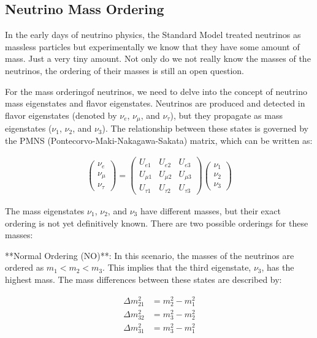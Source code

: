 \subsection{Neutrino Mass Ordering}

In the early days of neutrino physics, the Standard Model treated neutrinos as massless particles but experimentally we know that they have some amount of mass.
Just a very tiny amount.
Not only do we not really know the masses of the neutrinos, the ordering of their masses is still an open question.

For the mass orderingof neutrinos, we need to delve into the concept of neutrino mass eigenstates and flavor eigenstates.
Neutrinos are produced and detected in flavor eigenstates (denoted by $\nu_e$, $\nu_\mu$, and $\nu_\tau$), but they propagate as mass eigenstates ($\nu_1$, $\nu_2$, and $\nu_3$).
The relationship between these states is governed by the PMNS (Pontecorvo-Maki-Nakagawa-Sakata) matrix, which can be written as:

\begin{align}
  \begin{pmatrix}
    \nu_e \\
    \nu_\mu \\
    \nu_\tau
  \end{pmatrix}
  =
  \begin{pmatrix}
    U_{e1} & U_{e2} & U_{e3} \\
    U_{\mu1} & U_{\mu2} & U_{\mu3} \\
    U_{\tau1} & U_{\tau2} & U_{\tau3}
  \end{pmatrix}
  \begin{pmatrix}
    \nu_1 \\
    \nu_2 \\
    \nu_3
  \end{pmatrix}
\end{align}

The mass eigenstates $\nu_1$, $\nu_2$, and $\nu_3$ have different masses, but their exact ordering is not yet definitively known.
There are two possible orderings for these masses:

**Normal Ordering (NO)**: In this scenario, the masses of the neutrinos are ordered as \( m_1 < m_2 < m_3 \).
This implies that the third eigenstate, $\nu_3$, has the highest mass.
The mass differences between these states are described by:

\begin{align}
  \Delta m_{21}^2 &= m_2^2 - m_1^2 \\
  \Delta m_{32}^2 &= m_3^2 - m_2^2 \\
  \Delta m_{31}^2 &= m_3^2 - m_1^2
\end{align}


